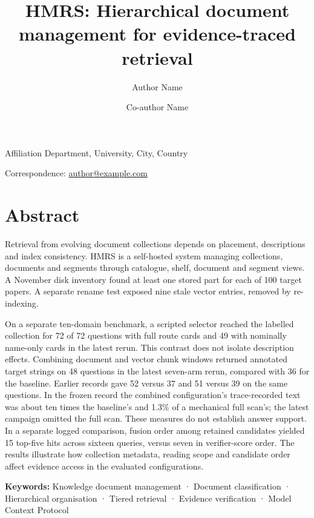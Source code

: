 \title{HMRS: Hierarchical document management for evidence-traced retrieval}
\author{Author Name\and Co-author Name}


\maketitle
\begin{center}Affiliation Department, University,
City, Country\end{center}
\begin{center}Correspondence: \href{mailto:author@example.com}{author@example.com}\end{center}

\section*{Abstract}

Retrieval from evolving document collections depends on placement,
descriptions and index consistency. HMRS is a self-hosted system managing
collections, documents and segments through catalogue, shelf, document and
segment views. A November disk inventory found at least one stored part for
each of 100 target papers. A separate rename test exposed nine stale vector
entries, removed by re-indexing.

On a separate ten-domain benchmark, a scripted selector reached the
labelled collection for 72 of 72 questions with full route cards and 49
with nominally name-only cards in the latest rerun. This contrast does not
isolate description effects. Combining document and vector chunk windows
returned annotated target strings
on 48 questions in the latest seven-arm rerun, compared with 36 for the
baseline. Earlier records gave 52 versus 37 and 51 versus 39 on the same
questions. In the frozen record the combined configuration's trace-recorded
text was about ten times the baseline's and 1.3\% of a mechanical full scan's;
the latest campaign omitted the full scan. These measures do not establish
answer support. In a separate logged comparison, fusion order among retained
candidates yielded 15 top-five hits across sixteen queries, versus seven in
verifier-score order. The results illustrate how collection metadata, reading scope and candidate order
affect evidence access in the evaluated configurations.

\noindent\textbf{Keywords:} Knowledge document management · Document classification · Hierarchical organisation · Tiered retrieval · Evidence verification · Model Context Protocol


